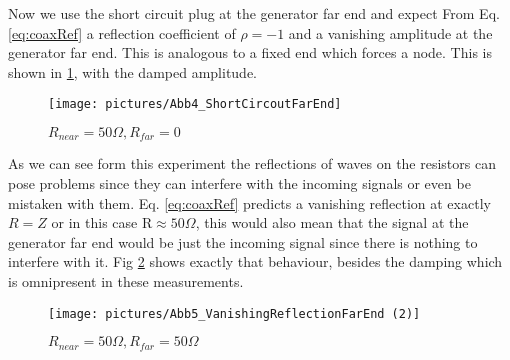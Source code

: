 \documentclass[a4paper,10pt,twocolumn]{article}
\begin{document}
    Now we use the short circuit plug at the generator far end and expect From Eq. \ref{eq:coaxRef} a reflection coefficient of $\rho = -1 $ and a vanishing amplitude at the generator far end.
    This is analogous to a fixed end which forces a node.
    This is shown in \ref{fig:ShortCircuitFarEnd}, with the damped amplitude.
    \begin{figure}[htbp]                                 %
        \begin{center}                                       %
            \texttt{[image: pictures/Abb4\_ShortCircoutFarEnd]}      %
            \caption[]{$R_{near}=50\Omega,R_{far} = 0$}   %
            \label{fig:ShortCircuitFarEnd}                                      %
        \end{center}
    \end{figure}
    
    As we can see form this experiment the reflections of waves on the resistors can pose problems since they can interfere with the incoming signals or even be mistaken with them.
    Eq. \ref{eq:coaxRef} predicts a vanishing reflection at exactly $R=Z$ or in this case R$\approx 50\Omega$, this would also mean that the signal at the generator far end would be just the incoming signal since there is nothing to interfere with it.
    Fig \ref{fig:VanishingReflectionFarEnd} shows exactly that behaviour, besides the damping which is omnipresent in these measurements.
    \begin{figure}[htbp]                                 
        \begin{center}                                       
            \texttt{[image: pictures/Abb5\_VanishingReflectionFarEnd (2)]}      
            \caption[]{$R_{near}=50\Omega, R_{far}=50\Omega $}   %
            \label{fig:VanishingReflectionFarEnd}                                      
        \end{center}
    \end{figure}
\end{document}
